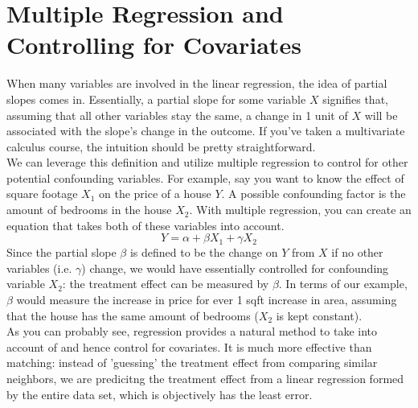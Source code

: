 \documentclass{article}
\begin{document}
\section{Multiple Regression and Controlling for Covariates}
When many variables are involved in the linear regression, the idea of partial slopes comes in.
Essentially, a partial slope for some variable $X$ signifies that, assuming that all other variables stay the same, a change in 1 unit of $X$ will be associated with the slope's change in the outcome. 
If you've taken a multivariate calculus course, the intuition should be pretty straightforward.
\\
We can leverage this definition and utilize multiple regression to control for other potential confounding variables.
For example, say you want to know the effect of square footage $X_1$ on the price of a house $Y$. 
A possible confounding factor is the amount of bedrooms in the house $X_2$.
With multiple regression, you can create an equation that takes both of these variables into account. 
$$Y = \alpha + \beta X_1 + \gamma X_2$$
Since the partial slope $\beta$ is defined to be the change on $Y$ from $X$ if no other variables (i.e. $\gamma$) change, we would have essentially controlled for confounding variable $X_2$: the treatment effect can be measured by $\beta$.
In terms of our example, $\beta$ would measure the increase in price for ever 1 sqft increase in area, assuming that the house has the same amount of bedrooms ($X_2$ is kept constant).
\\
As you can probably see, regression provides a natural method to take into account of and hence control for covariates. 
It is much more effective than matching: instead of 'guessing' the treatment effect from comparing similar neighbors, we are predicitng the treatment effect from a linear regression formed by the entire data set, which is objectively has the least error.
\end{document}
